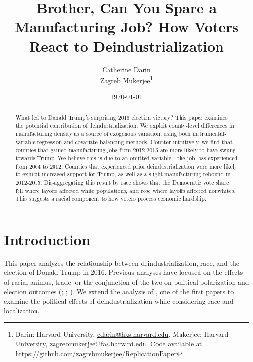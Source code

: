 \documentclass[]{AEA}
\begin{document}
\title{Brother, Can You Spare a Manufacturing Job? How Voters React to
Deindustrialization}


\author{
  Catherine Darin\\
  Zagreb Mukerjee\thanks{
  Darin: Harvard
University, \href{mailto:cdarin@hks.harvard.edu}{cdarin@hks.harvard.edu}.
  Mukerjee: Harvard
University, \href{mailto:zagrebmukerjee@fas.harvard.edu}{zagrebmukerjee@fas.harvard.edu}.
  Code available at https://github.com/zagrebmukerjee/ReplicationPaper
}
}

\date{\today}
\pubVolume{}
\pubIssue{}
\JEL{}
\Keywords{}

\begin{abstract}
What led to Donald Trump's surprising 2016 election victory? This paper
examines the potential contribution of deindustrialization. We exploit
county-level differences in manufacturing density as a source of
exogenous variation, using both instrumental-variable regression and
covariate balancing methods. Counter-intuitively, we find that counties
that gained manufacturing jobs from 2012-2015 are more likely to have
swung towards Trump. We believe this is due to an omitted variable - the
job loss experienced from 2004 to 2012. Counties that experienced prior
deindustrialization were more likely to exhibit increased support for
Trump, as well as a slight manufacturing rebound in 2012-2015.
Dis-aggregating this result by race shows that the Democratic vote share
fell where layoffs affected white populations, and rose where layoffs
affected nonwhites. This suggests a racial component to how voters
process economic hardship.
\end{abstract}


\maketitle

\section{Introduction} 
\label{Introduction}

This paper analyzes the relationship between deindustrialization, race,
and the election of Donald Trump in 2016. Previous analyses have focused
on the effects of racial animus, trade, or the conjunction of the two on
political polarization and election outcomes (\cite{Autor20};
\cite{Che16}; \cite{BR21}). We extend the analysis of \cite{Baccini21},
one of the first papers to examine the political effects of
deindustrialization while considering race and localization.
\end{document}
